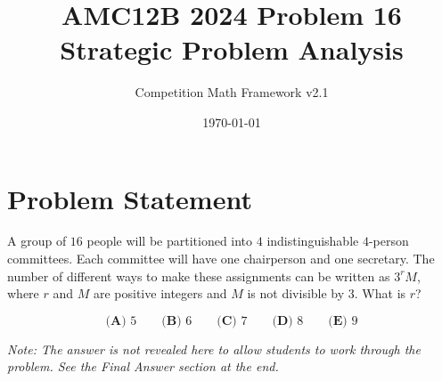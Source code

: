 \documentclass[12pt]{article}
\begin{document}
\title{AMC12B 2024 Problem 16\\Strategic Problem Analysis}
\author{Competition Math Framework v2.1}
\date{\today}
\maketitle

\section*{Problem Statement}

A group of $16$ people will be partitioned into $4$ indistinguishable $4$-person committees. Each committee will have one chairperson and one secretary. The number of different ways to make these assignments can be written as $3^{r}M$, where $r$ and $M$ are positive integers and $M$ is not divisible by $3$. What is $r$?

$$\textbf{(A) }5 \qquad \textbf{(B) }6 \qquad \textbf{(C) }7 \qquad \textbf{(D) }8 \qquad \textbf{(E) }9$$

\vspace{0.3cm}
\noindent\textit{Note: The answer is not revealed here to allow students to work through the problem. See the Final Answer section at the end.}
\end{document}
